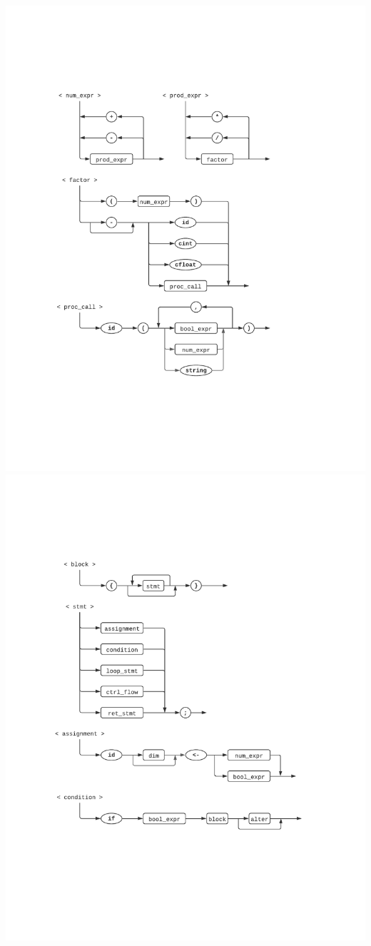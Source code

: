 \documentclass[12pt, titlepage]{article}
\begin{document}
\newpage
\includegraphics[trim={1in, 1in, 1in, 1in}, clip, scale=0.95]{d4}
\newpage
\includegraphics[trim={1in, 1in, 1in, 1in}, clip, scale=0.95]{d5}
\end{document}
